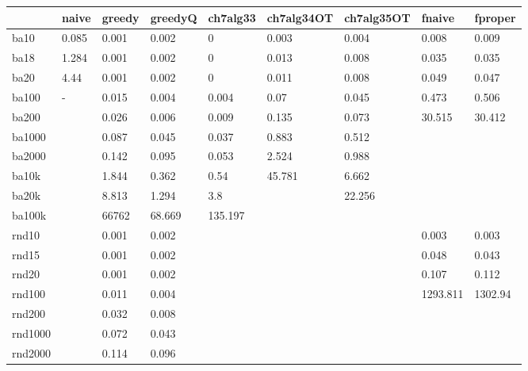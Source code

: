 \begin{table}[h]
	\begin{tabular}{lllllllll}
		\hline
		& naive & greedy & greedyQ & ch7alg33 & ch7alg34OT & ch7alg35OT & fnaive   & fproper \\ \hline
		ba10    & 0.085 & 0.001  & 0.002   & 0        & 0.003      & 0.004      & 0.008    & 0.009   \\
		ba18    & 1.284 & 0.001  & 0.002   & 0        & 0.013      & 0.008      & 0.035    & 0.035   \\
		ba20    & 4.44  & 0.001  & 0.002   & 0        & 0.011      & 0.008      & 0.049    & 0.047   \\
		ba100   & -     & 0.015  & 0.004   & 0.004    & 0.07       & 0.045      & 0.473    & 0.506   \\
		ba200   &       & 0.026  & 0.006   & 0.009    & 0.135      & 0.073      & 30.515   & 30.412  \\
		ba1000  &       & 0.087  & 0.045   & 0.037    & 0.883      & 0.512      &          &         \\
		ba2000  &       & 0.142  & 0.095   & 0.053    & 2.524      & 0.988      &          &         \\
		ba10k   &       & 1.844  & 0.362   & 0.54     & 45.781     & 6.662      &          &         \\
		ba20k   &       & 8.813  & 1.294   & 3.8      &            & 22.256     &          &         \\
		ba100k  &       & 66762  & 68.669  & 135.197  &            &            &          &         \\
		rnd10   &       & 0.001  & 0.002   &          &            &            & 0.003    & 0.003   \\
		rnd15   &       & 0.001  & 0.002   &          &            &            & 0.048    & 0.043   \\
		rnd20   &       & 0.001  & 0.002   &          &            &            & 0.107    & 0.112   \\
		rnd100  &       & 0.011  & 0.004   &          &            &            & 1293.811 & 1302.94 \\
		rnd200  &       & 0.032  & 0.008   &          &            &            &          &         \\
		rnd1000 &       & 0.072  & 0.043   &          &            &            &          &         \\
		rnd2000 &       & 0.114  & 0.096   &          &            &            &          &         \\

\end{tabular}
\end{table}

